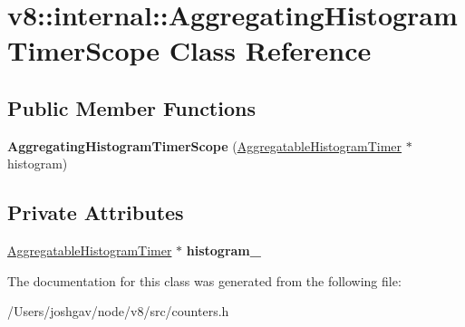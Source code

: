 \hypertarget{classv8_1_1internal_1_1_aggregating_histogram_timer_scope}{}\section{v8\+:\+:internal\+:\+:Aggregating\+Histogram\+Timer\+Scope Class Reference}
\label{classv8_1_1internal_1_1_aggregating_histogram_timer_scope}
\subsection*{Public Member Functions}
\begin{DoxyCompactItemize}
\item 
{\bfseries Aggregating\+Histogram\+Timer\+Scope} (\hyperlink{classv8_1_1internal_1_1_aggregatable_histogram_timer}{Aggregatable\+Histogram\+Timer} $\ast$histogram)\hypertarget{classv8_1_1internal_1_1_aggregating_histogram_timer_scope_a96403652799814786ac2fc73d2cbb2ce}{}\label{classv8_1_1internal_1_1_aggregating_histogram_timer_scope_a96403652799814786ac2fc73d2cbb2ce}

\end{DoxyCompactItemize}
\subsection*{Private Attributes}
\begin{DoxyCompactItemize}
\item 
\hyperlink{classv8_1_1internal_1_1_aggregatable_histogram_timer}{Aggregatable\+Histogram\+Timer} $\ast$ {\bfseries histogram\+\_\+}\hypertarget{classv8_1_1internal_1_1_aggregating_histogram_timer_scope_a463a44b8978b0434cc925103e7d632b5}{}\label{classv8_1_1internal_1_1_aggregating_histogram_timer_scope_a463a44b8978b0434cc925103e7d632b5}

\end{DoxyCompactItemize}


The documentation for this class was generated from the following file\+:\begin{DoxyCompactItemize}
\item 
/\+Users/joshgav/node/v8/src/counters.\+h\end{DoxyCompactItemize}
